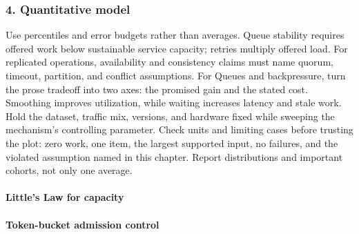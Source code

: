 \subsubsection*{4. Quantitative model}
Use percentiles and error budgets rather than averages. Queue stability requires offered work below sustainable service capacity; retries multiply offered load. For replicated operations, availability and consistency claims must name quorum, timeout, partition, and conflict assumptions.
For Queues and backpressure, turn the prose tradeoff into two axes: the promised gain and the stated cost. Smoothing improves utilization, while waiting increases latency and stale work. Hold the dataset, traffic mix, versions, and hardware fixed while sweeping the mechanism's controlling parameter.
Check units and limiting cases before trusting the plot: zero work, one item, the largest supported input, no failures, and the violated assumption named in this chapter. Report distributions and important cohorts, not only one average.
\paragraph{Little's Law for capacity}
\paragraph{Token-bucket admission control}

